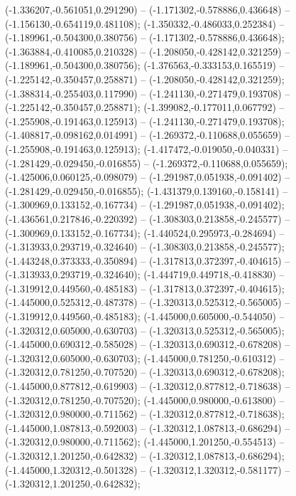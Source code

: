  (-1.336207,-0.561051,0.291290) -- (-1.171302,-0.578886,0.436648) -- (-1.156130,-0.654119,0.481108);
 (-1.350332,-0.486033,0.252384) -- (-1.189961,-0.504300,0.380756) -- (-1.171302,-0.578886,0.436648);
 (-1.363884,-0.410085,0.210328) -- (-1.208050,-0.428142,0.321259) -- (-1.189961,-0.504300,0.380756);
 (-1.376563,-0.333153,0.165519) -- (-1.225142,-0.350457,0.258871) -- (-1.208050,-0.428142,0.321259);
 (-1.388314,-0.255403,0.117990) -- (-1.241130,-0.271479,0.193708) -- (-1.225142,-0.350457,0.258871);
 (-1.399082,-0.177011,0.067792) -- (-1.255908,-0.191463,0.125913) -- (-1.241130,-0.271479,0.193708);
 (-1.408817,-0.098162,0.014991) -- (-1.269372,-0.110688,0.055659) -- (-1.255908,-0.191463,0.125913);
 (-1.417472,-0.019050,-0.040331) -- (-1.281429,-0.029450,-0.016855) -- (-1.269372,-0.110688,0.055659);
 (-1.425006,0.060125,-0.098079) -- (-1.291987,0.051938,-0.091402) -- (-1.281429,-0.029450,-0.016855);
 (-1.431379,0.139160,-0.158141) -- (-1.300969,0.133152,-0.167734) -- (-1.291987,0.051938,-0.091402);
 (-1.436561,0.217846,-0.220392) -- (-1.308303,0.213858,-0.245577) -- (-1.300969,0.133152,-0.167734);
 (-1.440524,0.295973,-0.284694) -- (-1.313933,0.293719,-0.324640) -- (-1.308303,0.213858,-0.245577);
 (-1.443248,0.373333,-0.350894) -- (-1.317813,0.372397,-0.404615) -- (-1.313933,0.293719,-0.324640);
 (-1.444719,0.449718,-0.418830) -- (-1.319912,0.449560,-0.485183) -- (-1.317813,0.372397,-0.404615);
 (-1.445000,0.525312,-0.487378) -- (-1.320313,0.525312,-0.565005) -- (-1.319912,0.449560,-0.485183);
 (-1.445000,0.605000,-0.544050) -- (-1.320312,0.605000,-0.630703) -- (-1.320313,0.525312,-0.565005);
 (-1.445000,0.690312,-0.585028) -- (-1.320313,0.690312,-0.678208) -- (-1.320312,0.605000,-0.630703);
 (-1.445000,0.781250,-0.610312) -- (-1.320312,0.781250,-0.707520) -- (-1.320313,0.690312,-0.678208);
 (-1.445000,0.877812,-0.619903) -- (-1.320312,0.877812,-0.718638) -- (-1.320312,0.781250,-0.707520);
 (-1.445000,0.980000,-0.613800) -- (-1.320312,0.980000,-0.711562) -- (-1.320312,0.877812,-0.718638);
 (-1.445000,1.087813,-0.592003) -- (-1.320312,1.087813,-0.686294) -- (-1.320312,0.980000,-0.711562);
 (-1.445000,1.201250,-0.554513) -- (-1.320312,1.201250,-0.642832) -- (-1.320312,1.087813,-0.686294);
 (-1.445000,1.320312,-0.501328) -- (-1.320312,1.320312,-0.581177) -- (-1.320312,1.201250,-0.642832);
